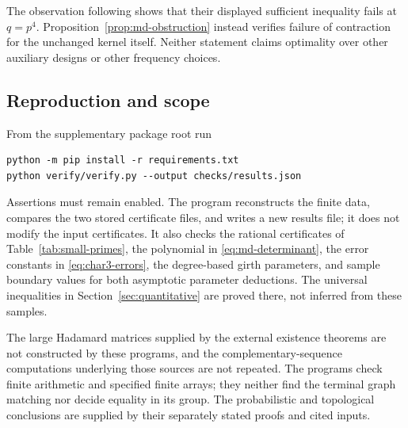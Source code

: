 The observation following \cite[Lemma~7.8]{MD26} shows that their displayed sufficient inequality fails at $q=p^4$. Proposition~\ref{prop:md-obstruction} instead verifies failure of contraction for the unchanged kernel itself. Neither statement claims optimality over other auxiliary designs or other frequency choices.

\subsection{Reproduction and scope}
From the supplementary package root run
\begin{verbatim}
python -m pip install -r requirements.txt
python verify/verify.py --output checks/results.json
\end{verbatim}
Assertions must remain enabled. The program reconstructs the finite data, compares the two stored certificate files, and writes a new results file; it does not modify the input certificates. It also checks the rational certificates of Table~\ref{tab:small-primes}, the polynomial in \eqref{eq:md-determinant}, the error constants in \eqref{eq:char3-errors}, the degree-based girth parameters, and sample boundary values for both asymptotic parameter deductions. The universal inequalities in Section~\ref{sec:quantitative} are proved there, not inferred from these samples.

The large Hadamard matrices supplied by the external existence theorems are not constructed by these programs, and the complementary-sequence computations underlying those sources are not repeated. The programs check finite arithmetic and specified finite arrays; they neither find the terminal graph matching nor decide equality in its group. The probabilistic and topological conclusions are supplied by their separately stated proofs and cited inputs.

